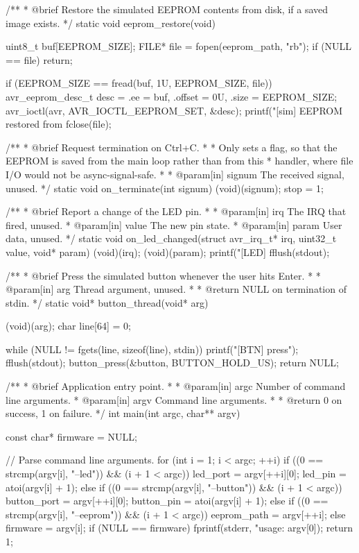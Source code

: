 \begin{ccode}
/**
 * @brief Restore the simulated EEPROM contents from disk, if a saved image exists.
 */
static void eeprom_restore(void)
{
    uint8_t buf[EEPROM_SIZE];
    FILE* file = fopen(eeprom_path, "rb");
    if (NULL == file) { return; }

    if (EEPROM_SIZE == fread(buf, 1U, EEPROM_SIZE, file))
    {
        avr_eeprom_desc_t desc = {.ee = buf, .offset = 0U, .size = EEPROM_SIZE};
        avr_ioctl(avr, AVR_IOCTL_EEPROM_SET, &desc);
        printf("[sim] EEPROM restored from %
    }
    fclose(file);
}

/**
 * @brief Request termination on Ctrl+C.
 *
 *        Only sets a flag, so that the EEPROM is saved from the main loop rather than from this
 *        handler, where file I/O would not be async-signal-safe.
 *
 * @param[in] signum The received signal, unused.
 */
static void on_terminate(int signum)
{
    (void)(signum);
    stop = 1;
}

/**
 * @brief Report a change of the LED pin.
 *
 * @param[in] irq The IRQ that fired, unused.
 * @param[in] value The new pin state.
 * @param[in] param User data, unused.
 */
static void on_led_changed(struct avr_irq_t* irq, uint32_t value, void* param)
{
    (void)(irq);
    (void)(param);
    printf("[LED] %
    fflush(stdout);
}

/**
 * @brief Press the simulated button whenever the user hits Enter.
 *
 * @param[in] arg Thread argument, unused.
 *
 * @return NULL on termination of stdin.
 */
static void* button_thread(void* arg)
{
    (void)(arg);
    char line[64] = {0};

    while (NULL != fgets(line, sizeof(line), stdin))
    {
        printf("[BTN] press\n");
        fflush(stdout);
        button_press(&button, BUTTON_HOLD_US);
    }
    return NULL;
}

/**
 * @brief Application entry point.
 *
 * @param[in] argc Number of command line arguments.
 * @param[in] argv Command line arguments.
 *
 * @return 0 on success, 1 on failure.
 */
int main(int argc, char** argv)
{
    const char* firmware = NULL;

    // Parse command line arguments.
    for (int i = 1; i < argc; ++i)
    {
        if ((0 == strcmp(argv[i], "--led")) && (i + 1 < argc))
        {
            led_port = argv[++i][0];
            led_pin  = atoi(argv[i] + 1);
        }
        else if ((0 == strcmp(argv[i], "--button")) && (i + 1 < argc))
        {
            button_port = argv[++i][0];
            button_pin  = atoi(argv[i] + 1);
        }
        else if ((0 == strcmp(argv[i], "--eeprom")) && (i + 1 < argc)) { eeprom_path = argv[++i]; }
        else { firmware = argv[i]; }
    }
    if (NULL == firmware)
    {
        fprintf(stderr, "usage: %
                argv[0]);
        return 1;
    }

}
\end{ccode}
